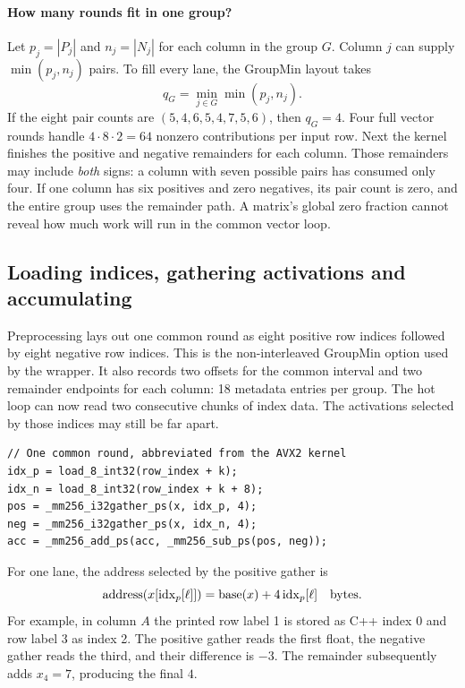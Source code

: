 \documentclass[11pt,a4paper]{article}
\begin{document}
\paragraph{How many rounds fit in one group?}
Let \(p_j=|P_j|\) and \(n_j=|N_j|\) for each column in the group \(G\).
Column \(j\) can supply \(\min(p_j,n_j)\) pairs. To fill every lane,
the GroupMin layout takes
\[
q_G=\min_{j\in G}\min(p_j,n_j).
\]
If the eight pair counts are \((5,4,6,5,4,7,5,6)\), then \(q_G=4\).
Four full vector rounds handle \(4\cdot8\cdot2=64\) nonzero contributions
per input row. Next the kernel finishes the positive and negative remainders
for each column. Those remainders may include \emph{both} signs: a column
with seven possible pairs has consumed only four. If one column has six
positives and zero negatives, its pair count is zero, and the entire group
uses the remainder path. A matrix's global zero fraction cannot reveal
how much work will run in the common vector loop.

\subsection{Loading indices, gathering activations and accumulating}
Preprocessing lays out one common round as eight positive row indices
followed by eight negative row indices. This is the non-interleaved
GroupMin option used by the wrapper. It also records two offsets for the
common interval and two remainder endpoints for each column: 18 metadata
entries per group. The hot loop can now read two consecutive chunks of index
data. The activations selected by those indices may still be far apart.
\begin{lstlisting}
// One common round, abbreviated from the AVX2 kernel
idx_p = load_8_int32(row_index + k);
idx_n = load_8_int32(row_index + k + 8);
pos = _mm256_i32gather_ps(x, idx_p, 4);
neg = _mm256_i32gather_ps(x, idx_n, 4);
acc = _mm256_add_ps(acc, _mm256_sub_ps(pos, neg));
\end{lstlisting}
For one lane, the address selected by the positive gather is
\[
\operatorname{address}(x[{\rm idx}_p[\ell]])
 = \operatorname{base}(x)+4\,{\rm idx}_p[\ell]\quad\text{bytes}.
\]
For example, in column \(A\) the printed row label 1 is stored as C++ index
0 and row label 3 as index 2. The positive gather reads the first float,
the negative gather reads the third, and their difference is \(-3\).
The remainder subsequently adds \(x_4=7\), producing the final \(4\).
\end{document}

